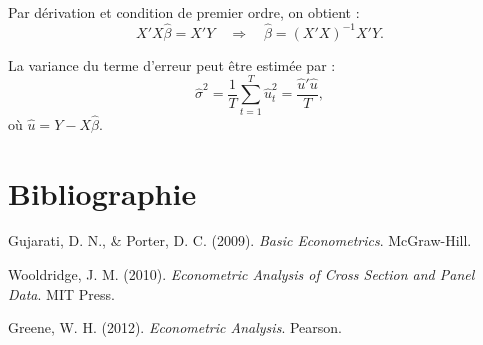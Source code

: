 \documentclass[14pt]{extarticle} %
\begin{document}
Par dérivation et condition de premier ordre, on obtient :
\[
X'X \hat{\beta} = X'Y \quad \Longrightarrow \quad \hat{\beta} = (X'X)^{-1}X'Y.
\]

La variance du terme d’erreur peut être estimée par :
\[
\hat{\sigma}^2 = \frac{1}{T} \sum_{t=1}^{T} \hat{u}_t^2 = \frac{\hat{u}'\hat{u}}{T},
\]
où \(\hat{u} = Y - X\hat{\beta}\).

\section*{Bibliographie}

\begin{thebibliography}{99}

Gujarati, D. N., \& Porter, D. C. (2009). \textit{Basic Econometrics}. McGraw-Hill.

Wooldridge, J. M. (2010). \textit{Econometric Analysis of Cross Section and Panel Data}. MIT Press.

Greene, W. H. (2012). \textit{Econometric Analysis}. Pearson.

\end{thebibliography}
\end{document}
